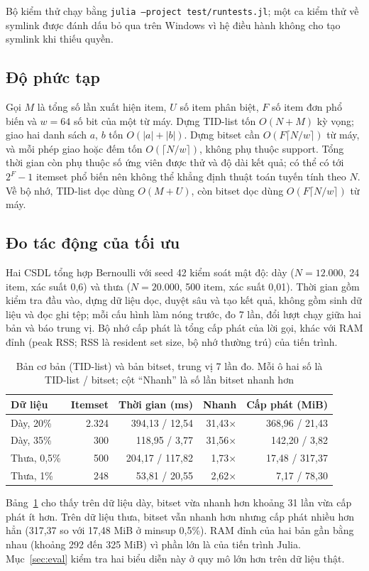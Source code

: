 Bộ kiểm thử chạy bằng \texttt{julia --project test/runtests.jl}; một ca kiểm thử về symlink được đánh dấu bỏ qua trên
Windows vì hệ điều hành không cho tạo symlink khi thiếu quyền.

\subsection{Độ phức tạp}

Gọi $M$ là tổng số lần xuất hiện item, $U$ số item phân biệt, $F$ số item đơn phổ biến và $w = 64$ số bit của
một từ máy. Dựng TID-list tốn $O(N + M)$ kỳ vọng; giao hai danh sách $a$, $b$ tốn $O(|a| + |b|)$. Dựng bitset
cần $O(F \lceil N/w \rceil)$ từ máy, và mỗi phép giao hoặc đếm tốn $O(\lceil N/w \rceil)$, không phụ thuộc
support. Tổng thời gian còn phụ thuộc số ứng viên được thử và độ dài kết quả; có thể có tới $2^F - 1$ itemset
phổ biến nên không thể khẳng định thuật toán tuyến tính theo $N$. Về bộ nhớ, TID-list dọc dùng $O(M + U)$, còn
bitset dọc dùng $O(F \lceil N/w \rceil)$ từ máy.

\subsection{Đo tác động của tối ưu}
\label{sec:impl-opt}

Hai CSDL tổng hợp Bernoulli với seed 42 kiểm soát mật độ: dày ($N = 12.000$, 24 item, xác suất 0,6) và thưa
($N = 20.000$, 500 item, xác suất 0,01). Thời gian gồm kiểm tra đầu vào, dựng dữ liệu dọc, duyệt sâu và tạo kết
quả, không gồm sinh dữ liệu và đọc ghi tệp; mỗi cấu hình làm nóng trước, đo 7 lần, đổi lượt chạy giữa hai bản
và báo trung vị. Bộ nhớ cấp phát là tổng cấp phát của lời gọi, khác với RAM đỉnh (peak RSS; RSS
là resident set size, bộ nhớ thường trú) của tiến trình.

\begin{table}[t]
\caption{Bản cơ bản (TID-list) và bản bitset, trung vị 7 lần đo. Mỗi ô hai số là TID-list / bitset;
cột ``Nhanh'' là số lần bitset nhanh hơn}
\label{tab:opt}
\centering
\footnotesize
\setlength{\tabcolsep}{2.5pt}
\begin{tabular}{@{}lrrrr@{}}
\toprule
Dữ liệu & Itemset & Thời gian (ms) & Nhanh & Cấp phát (MiB) \\
\midrule
Dày, 20\% & 2.324 & 394,13 / 12,54 & 31,43× & 368,96 / 21,43 \\
Dày, 35\% & 300 & 118,95 / 3,77 & 31,56× & 142,20 / 3,82 \\
Thưa, 0,5\% & 500 & 204,17 / 117,82 & 1,73× & 17,48 / 317,37 \\
Thưa, 1\% & 248 & 53,81 / 20,55 & 2,62× & 7,17 / 78,30 \\
\bottomrule
\end{tabular}
\end{table}

Bảng~\ref{tab:opt} cho thấy trên dữ liệu dày, bitset vừa nhanh hơn khoảng 31 lần vừa cấp phát ít hơn. Trên dữ
liệu thưa, bitset vẫn nhanh hơn nhưng cấp phát nhiều hơn hẳn (317,37 so với 17,48 MiB ở minsup 0,5\%). RAM đỉnh
của hai bản gần bằng nhau (khoảng 292 đến 325 MiB) vì phần lớn là của tiến trình Julia. Mục~\ref{sec:eval} kiểm
tra hai biểu diễn này ở quy mô lớn hơn trên dữ liệu thật.
